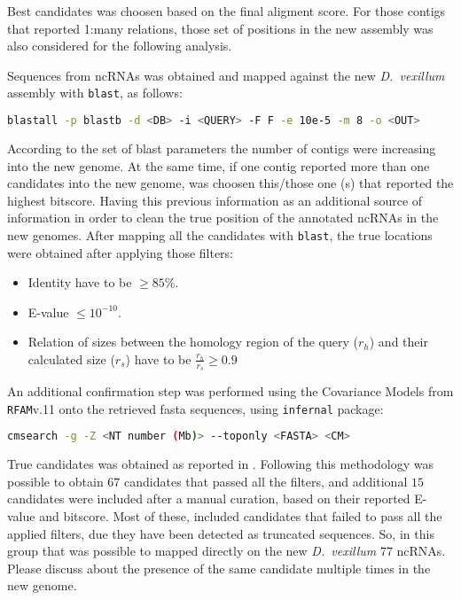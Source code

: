 \documentclass[11pt]{article}
\newcommand{\TODO}[1]{\begingroup\color{red}#1\endgroup}
\begin{document}
Best candidates was choosen based on the final aligment score. For those
contigs that reported 1:many relations, those set of positions in the new
assembly was also considered for the following analysis.

Sequences from ncRNAs was obtained and mapped against the new \textit{D.\
vexillum} assembly with \texttt{blast}, as follows:

\begin{lstlisting}[language=bash, breaklines=true]
blastall -p blastb -d <DB> -i <QUERY> -F F -e 10e-5 -m 8 -o <OUT>
\end{lstlisting}

According to the set of blast parameters the number of contigs were increasing
into the new genome. At the same time, if one contig reported more than one
candidates into the new genome, was choosen this/those one (s) that reported the 
highest bitscore. Having this previous information as an additional source of 
information in order to clean the true position of the annotated ncRNAs in the
new genomes. After mapping all the candidates with \texttt{blast}, the true locations
were obtained after applying those filters:
\begin{itemize}
 \item Identity have to be $\geq 85$\%.
 \item E-value $\leq 10^{-10}$.
 \item Relation of sizes between the homology region of the query
  ($r_h$) and their calculated size ($r_s$) have to be $\frac{r_h}{r_s} \geq 0.9$
\end{itemize}

An additional confirmation step was performed using the Covariance Models from
\texttt{RFAM}v.11 onto the retrieved fasta sequences, using \texttt{infernal} package:
\begin{lstlisting}[language=bash, breaklines=true]
cmsearch -g -Z <NT number (Mb)> --toponly <FASTA> <CM>
\end{lstlisting}

True candidates was obtained as reported in \cite{}. Following this
methodology was possible to obtain $67$ candidates that passed all the filters, 
and additional $15$ candidates were included after a manual curation, based
on their reported E-value and bitscore. Most of these, included candidates that
failed to pass all the applied filters, due they have been detected as 
truncated sequences.
So, in this group that was possible to mapped directly on the new 
\textit{D.\ vexillum} $77$ ncRNAs. \TODO{Please discuss about the
presence of the same candidate multiple times in the new genome}.
\end{document}
